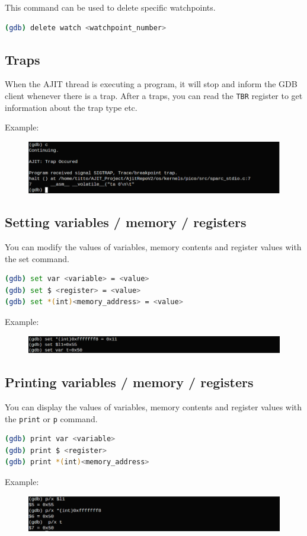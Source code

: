 \documentclass[a4paper, 11pt]{article}
\begin{document}
This command can be used to delete specific watchpoints.
\begin{lstlisting}[language=bash]
(gdb) delete watch <watchpoint_number>
\end{lstlisting}

\subsection{Traps}
When the AJIT thread is executing a program, it will stop and inform the GDB
client whenever there is a trap. After a traps, you can read the \texttt{TBR} 
register to get information about the trap type etc.

Example:
\begin{figure}[H]
	\centering
	\includegraphics[width=0.8\columnwidth]{Figs/eigth.png}
\end{figure}
\subsection{Setting variables / memory / registers}
You can modify the values of variables, memory contents and register values with the set command.
\begin{lstlisting}[language=bash]
(gdb) set var <variable> = <value>
(gdb) set $ <register> = <value>
(gdb) set *(int)<memory_address> = <value>
\end{lstlisting}
Example:
\begin{figure}[H]
	\centering
	\includegraphics[width=0.8\columnwidth]{Figs/nine.png}
\end{figure}
\subsection*{Printing variables / memory / registers}
You can display the values of variables, memory contents and register values with the \texttt{print} or \texttt{p} command.
\begin{lstlisting}[language=bash]
(gdb) print var <variable>
(gdb) print $ <register>
(gdb) print *(int)<memory_address>
\end{lstlisting}
Example:
\begin{figure}[H]
	\centering
	\includegraphics[width=0.8\columnwidth]{Figs/eleven.png}
\end{figure}
\end{document}
